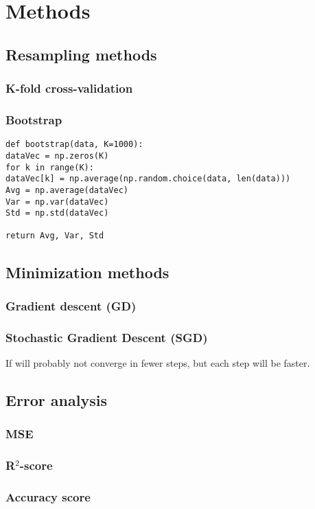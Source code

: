 \section{Methods} \label{sec:methods}

\subsection{Resampling methods}
\subsubsection{K-fold cross-validation}

\subsubsection{Bootstrap}
\lstset{basicstyle=\scriptsize}
\begin{lstlisting}
def bootstrap(data, K=1000):
dataVec = np.zeros(K)
for k in range(K):
dataVec[k] = np.average(np.random.choice(data, len(data)))
Avg = np.average(dataVec)
Var = np.var(dataVec)
Std = np.std(dataVec)

return Avg, Var, Std
\end{lstlisting}

\subsection{Minimization methods}

\subsubsection{Gradient descent (GD)}

\subsubsection{Stochastic Gradient Descent (SGD)}
If will probably not converge in fewer steps, but each step will be faster.

\subsection{Error analysis}
\subsubsection{MSE}
\subsubsection{R$^2$-score}
\subsubsection{Accuracy score}
